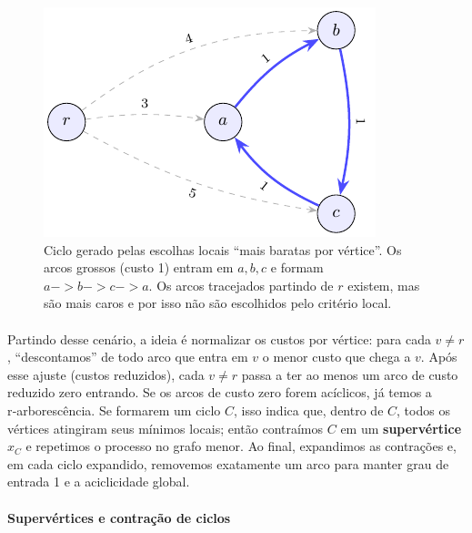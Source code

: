 \documentclass[12pt,a4paper]{article}
\def\emph#1{#1}%
\def\to{->}%
\begin{document}
\begin{figure}[H]
    \centering
    \includegraphics[width=0.9\linewidth]{figures/fig_chu_liu_cycle_micro.pdf}

    \caption{Ciclo gerado pelas escolhas locais “mais baratas por vértice”. Os arcos grossos (custo 1) entram em \(a,b,c\) e formam \(a\to b\to c\to a\). Os arcos tracejados partindo de \(r\) existem, mas são mais caros e por isso não são escolhidos pelo critério local.}
    \label{fig:chu-liu-cycle-micro}\end{figure}


\paragraph{}
Partindo desse cenário, a ideia é \emph{normalizar os custos por vértice}: para cada \(v\neq r\), “descontamos” de todo arco que entra em \(v\) o menor custo que chega a \(v\). Após esse ajuste (custos reduzidos), cada \(v\neq r\) passa a ter ao menos um arco de custo reduzido zero entrando. Se os arcos de custo zero forem acíclicos, já temos a r‑arborescência. Se formarem um ciclo \(C\), isso indica que, dentro de \(C\), todos os vértices atingiram seus mínimos locais; então \emph{contraímos} \(C\) em um \textbf{supervértice} \(x_C\) e repetimos o processo no grafo menor. Ao final, \emph{expandimos} as contrações e, em cada ciclo expandido, removemos exatamente um arco para manter grau de entrada 1 e a aciclicidade global.

\paragraph{Supervértices e contração de ciclos}
\end{document}
